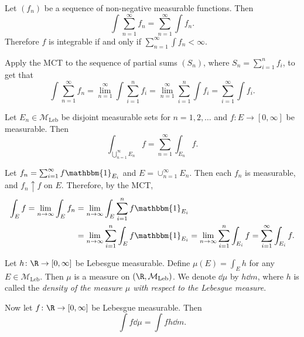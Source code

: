 \documentclass{maths}
\newcommand{\mleb}{\mathcal{M}_{\text{Leb}}}
\newcommand{\ind}{\mathbbm{1}}
\begin{document}
\begin{thm}
    Let $(f_n)$ be a sequence of non-negative measurable functions.
    Then
    \[
        \int \sum_{n=1}^{\infty} f_n =
        \sum_{n=1}^{\infty} \int f_n.
    \]
    Therefore $f$ is integrable if and only if $\sum_{n=1}^{\infty} \int f_n < \infty$.
\end{thm}

\begin{prf}
    Apply the MCT to the sequence of partial sums $(S_n)$, where $S_n = \sum_{i=1}^n f_i$, to get that
    \[
        \int \sum_{n=1}^{\infty} f_n =
        \lim_{n=1}^{\infty} \int \sum_{i=1}^n f_i =
        \lim_{n=1}^{\infty} \sum_{i=1}^n \int f_i =
        \sum_{i=1}^{\infty} \int f_i.
    \]
\end{prf}

\begin{thm}
    Let $E_n\in\mleb$ be disjoint measurable sets for $n=1,2,\ldots$ and $f\colon E\to[0,\infty]$ be measurable.
    Then
    \[
        \int_{\bigcup\limits_{n=1}^{\infty} E_n} f =
        \sum_{n=1}^{\infty} \int_{E_n} f.
    \]
\end{thm}

\begin{prf}
    Let $f_n=\sum_{i=1}^{\infty} f\ind_{E_i}$ and $E=\cup_{n=1}^{\infty} E_n$.
    Then each $f_n$ is measurable, and $f_n\uparrow f$ on $E$.
    Therefore, by the MCT,
    \begin{align*}
        \int_E f =
        \lim_{n\to\infty} \int_E f_n
        &= \lim_{n\to\infty} \int_E \sum_{i=1}^n f\ind_{E_i}\\
        &= \lim_{n\to\infty} \sum_{i=1}^n \int_E f\ind_{E_i}
        = \lim_{n\to\infty} \sum_{i=1}^n \int_{E_i} f
        = \sum_{i=1}^{\infty} \int_{E_i} f.
    \end{align*}
\end{prf}

\begin{cor}
    Let $h\colon\R\to[0,\infty]$ be Lebesgue measurable.
    Define $\mu(E)=\int_E h$ for any $E\in\mleb$.
    Then $\mu$ is a measure on $(\R,\mleb)$.
    We denote $\dd{\mu}$ by $h\dd{m}$, where $h$ is called the \emph{density of the measure $\mu$ with respect to the Lebesgue measure}.

    Now let $f\colon\R\to[0,\infty]$ be Lebesgue measurable.
    Then
    \[
        \int f \dd{\mu} =
        \int fh \dd{m}.
    \]
\end{cor}
\end{document}
